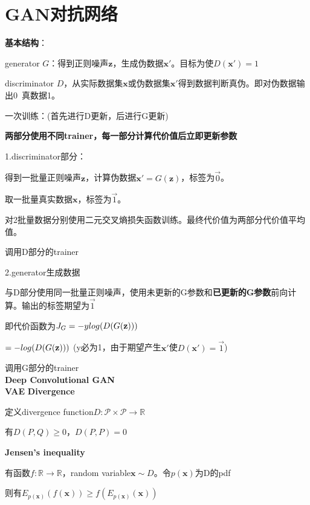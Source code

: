 \documentclass[UTF8]{ctexart}
\begin{document}
\section{GAN对抗网络}
\noindent \textbf{基本结构}：

  generator $G$：得到正则噪声$\mathbf{z}$，生成伪数据$\mathbf{x}'$。目标为使$D(\mathbf{x}') = 1$
  
  discriminator $D$，从实际数据集$\mathbf{x}$或伪数据集$\mathbf{x}'$得到数据判断真伪。即对伪数据输出0\ 真数据1。

  一次训练：(首先进行D更新，后进行G更新)

  \quad \textbf{两部分使用不同trainer，每一部分计算代价值后立即更新参数}

  \quad 1.discriminator部分：
  
  \quad \quad 得到一批量正则噪声$\mathbf{z}$，计算伪数据$\mathbf{x}' = G(\mathbf{z})$，标签为$\vec{0}$。
  
  \quad \quad 取一批量真实数据$\mathbf{x}$，标签为$\vec{1}$。
  
  \quad \quad 对2批量数据分别使用二元交叉熵损失函数训练。最终代价值为两部分代价值平均值。

  \quad \quad 调用D部分的trainer

  \quad 2.generator生成数据

  \quad \quad 与D部分使用同一批量正则噪声，使用未更新的G参数和\textbf{已更新的G参数}前向计算。输出的标签期望为$\vec{1}$
  
  \quad \quad 即代价函数为$J_G = -y \space log(D(G(\mathbf{z})))$ 
  
  \quad \quad \quad $ = - \space log(D(G(\mathbf{z})))$ (y必为1，由于期望产生$\mathbf{x}'$使$D(\mathbf{x}') = \vec{1}$)
  
  \quad \quad 调用G部分的trainer\\
\textbf{Deep Convolutional GAN}\\

\textbf{VAE}
  \textbf{Divergence}

  \quad 定义divergence function$D: \mathcal{P} \times \mathcal{P} \rightarrow \mathbb{R} $
  
  \quad 有$D(P, Q) \geq 0$，$D(P, P) = 0$

  \textbf{Jensen's inequality}

  \quad 有函数$f: \mathbb{R} \to \mathbb{R} $，random variable$\mathbf{x} \sim D$。令$p(\mathbf{x})$为D的pdf

  \quad 则有$E_{p(\mathbf{x})}(f(\mathbf{x})) \geq f(E_{p(\mathbf{x})}(\mathbf{x}))$
\end{document}
